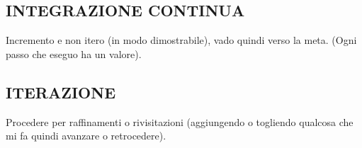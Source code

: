 		\subsection{INTEGRAZIONE CONTINUA}  \label{integrazione}
		Incremento e non itero (in modo dimostrabile), vado quindi verso la meta. (Ogni passo che eseguo ha un valore).
		
		
		\subsection{ITERAZIONE}  \label{iterazione}
		Procedere per raffinamenti o rivisitazioni (aggiungendo o togliendo qualcosa che mi fa quindi avanzare o retrocedere).
	
	
	

